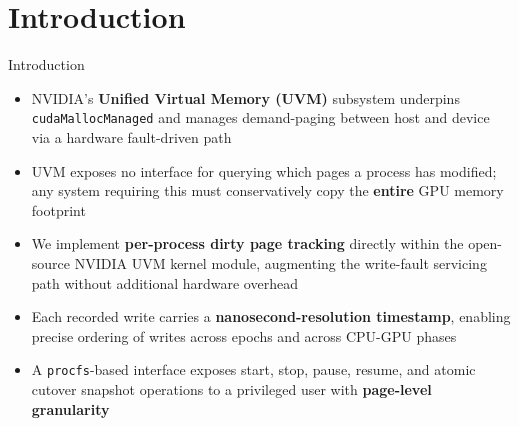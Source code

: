 \section{Introduction}

\begin{frame}{Introduction}
\begin{itemize}[<+->]
    \item NVIDIA's \textbf{Unified Virtual Memory (UVM)} subsystem underpins \texttt{cudaMallocManaged} and manages demand-paging between host and device via a hardware fault-driven path
    \item UVM exposes no interface for querying which pages a process has modified; any system requiring this must conservatively copy the \textbf{entire} GPU memory footprint
    \item We implement \textbf{per-process dirty page tracking} directly within the open-source NVIDIA UVM kernel module, augmenting the write-fault servicing path without additional hardware overhead
    \item Each recorded write carries a \textbf{nanosecond-resolution timestamp}, enabling precise ordering of writes across epochs and across CPU-GPU phases
    \item A \texttt{procfs}-based interface exposes start, stop, pause, resume, and atomic cutover snapshot operations to a privileged user with \textbf{page-level granularity}
\end{itemize}
\end{frame}
